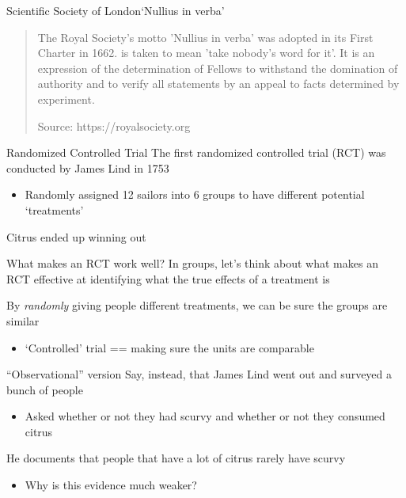 \documentclass[aspectratio=169,t,11pt,table]{beamer}
\begin{document}
\begin{frame}{Scientific Society of London}{`Nullius in verba'}
  \begin{quote}
    The Royal Society's motto 'Nullius in verba' was adopted in its First Charter in 1662. is taken to mean 'take nobody's word for it'. It is an expression of the determination of Fellows to withstand the domination of authority and to verify all statements by an appeal to facts determined by experiment.

    Source: https://royalsociety.org
  \end{quote}
\end{frame}

\begin{frame}{Randomized Controlled Trial}
  The first randomized controlled trial (RCT) was conducted by James Lind in 1753
  \begin{itemize}
    \item Randomly assigned 12 sailors into 6 groups to have different potential `treatments'
  \end{itemize}

  \bigskip
  Citrus ended up winning out
\end{frame}

\begin{frame}{What makes an RCT work well?}
  In groups, let's think about what makes an RCT effective at identifying what the true effects of a treatment is

  \pause
  By \emph{randomly} giving people different treatments, we can be sure the groups are similar
  \begin{itemize}
    \item `Controlled' trial == making sure the units are comparable
  \end{itemize}
\end{frame}

\begin{frame}{``Observational'' version}
  Say, instead, that James Lind went out and surveyed a bunch of people
  \begin{itemize}
    \item Asked whether or not they had scurvy and whether or not they consumed citrus
  \end{itemize}
  
  \bigskip
  He documents that people that have a lot of citrus rarely have scurvy
  \begin{itemize}
    \item Why is this evidence much weaker? 
  \end{itemize}
\end{frame}
\end{document}
